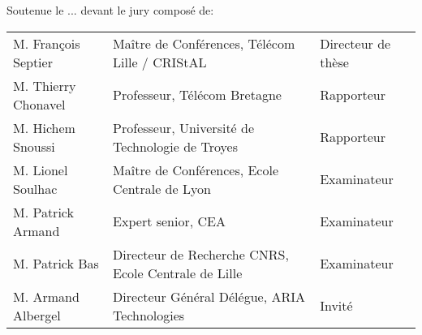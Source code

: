 \begin{flushleft}

Soutenue le ... devant le jury composé de:\\[2ex]



\addtolength{\textwidth}{-1cm}
\begin{tabular}{lll}
 M. François {\sc Septier} & Maître de Conférences, Télécom Lille / CRIStAL & Directeur de thèse\\
 M. Thierry {\sc Chonavel} & Professeur, Télécom Bretagne & Rapporteur \\
 M. Hichem {\sc Snoussi} & Professeur, Université de Technologie de Troyes &  Rapporteur  \\
 M. Lionel {\sc Soulhac} & Maître de Conférences, Ecole Centrale de Lyon & Examinateur  \\
 M. Patrick {\sc Armand} & Expert senior, CEA &  Examinateur  \\
 M. Patrick {\sc Bas} & Directeur de Recherche CNRS, Ecole Centrale de Lille &  Examinateur  \\
 M. Armand {\sc Albergel} & Directeur Général Délégue, ARIA Technologies &  Invité  \\
\end{tabular}
\addtolength{\textwidth}{1cm}

\end{flushleft}


